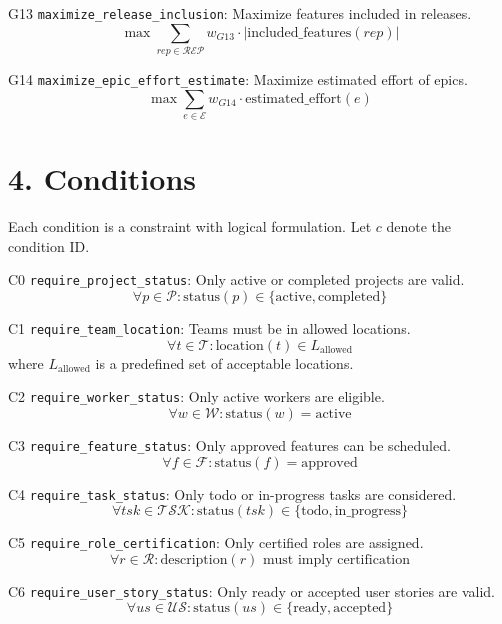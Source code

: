 \documentclass[12pt]{article}
\begin{document}
    \item[G13] \texttt{maximize\_release\_inclusion}: Maximize features included in releases.
    \[
    \max \sum_{rep \in \mathcal{REP}} w_{G13} \cdot |\text{included\_features}(rep)|
    \]

    \item[G14] \texttt{maximize\_epic\_effort\_estimate}: Maximize estimated effort of epics.
    \[
    \max \sum_{e \in \mathcal{E}} w_{G14} \cdot \text{estimated\_effort}(e)
    \]

\section{4. Conditions}

Each condition is a constraint with logical formulation. Let $c$ denote the condition ID.

\item[C0] \texttt{require\_project\_status}: Only active or completed projects are valid.
    \[
    \forall p \in \mathcal{P}: \text{status}(p) \in \{\text{active}, \text{completed}\}
    \]

    \item[C1] \texttt{require\_team\_location}: Teams must be in allowed locations.
    \[
    \forall t \in \mathcal{T}: \text{location}(t) \in L_{\text{allowed}}
    \]
    where $L_{\text{allowed}}$ is a predefined set of acceptable locations.

    \item[C2] \texttt{require\_worker\_status}: Only active workers are eligible.
    \[
    \forall w \in \mathcal{W}: \text{status}(w) = \text{active}
    \]

    \item[C3] \texttt{require\_feature\_status}: Only approved features can be scheduled.
    \[
    \forall f \in \mathcal{F}: \text{status}(f) = \text{approved}
    \]

    \item[C4] \texttt{require\_task\_status}: Only todo or in-progress tasks are considered.
    \[
    \forall tsk \in \mathcal{TSK}: \text{status}(tsk) \in \{\text{todo}, \text{in\_progress}\}
    \]

    \item[C5] \texttt{require\_role\_certification}: Only certified roles are assigned.
    \[
    \forall r \in \mathcal{R}: \text{description}(r) \text{ must imply certification}
    \]

    \item[C6] \texttt{require\_user\_story\_status}: Only ready or accepted user stories are valid.
    \[
    \forall us \in \mathcal{US}: \text{status}(us) \in \{\text{ready}, \text{accepted}\}
    \]
\end{document}
